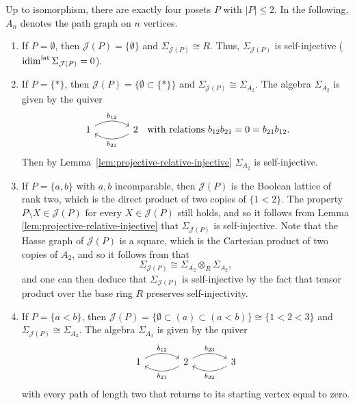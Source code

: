 \documentclass[a4paper,leqno]{amsart}
\begin{document}
\begin{eg}\label{eg:posets-at-most-two-elements}
Up to isomorphism, there are exactly four posets $P$ with $|P|\leq2$. In the following, $A_n$ denotes the path graph on $n$ vertices.
\begin{enumerate}
\item If $P=\emptyset$, then $\mathcal J(P)=\{\emptyset\}$ and $\Sigma_{\mathcal J(P)}\cong R$.  Thus, $\Sigma_{\mathcal{J}(P)}$ is self-injective ($\operatorname{idim}^{\operatorname{lat}} \Sigma_{\mathcal{J}(P)}=0$).

\item If $P=\{\ast\}$, then $\mathcal J(P)=\{\emptyset \subset \{\ast\}\}$ and $\Sigma_{\mathcal J(P)}\cong\Sigma_{A_2}$. The algebra $\Sigma_{A_2}$ is given by the quiver
\[
\begin{tikzcd}[column sep=large]
{1} & {2}
\arrow["{b_{12}}", from=1-1, to=1-2, bend left]
\arrow["{b_{21}}", from=1-2, to=1-1, bend left]
\end{tikzcd} \;\; \text{with relations } b_{12}b_{21}=0=b_{21}b_{12}.
\]
Then by Lemma~\ref{lem:projective-relative-injective} $\Sigma_{A_2}$ is self-injective.

\item If $P=\{a,b\}$ with $a,b$ incomparable, then $\mathcal J(P)$ is the Boolean lattice of rank two, which is the direct product of two copies of $\{1<2\}$.  The property $P\setminus X\in\mathcal J(P)$ for every $X\in\mathcal J(P)$ still holds, and so it follows from Lemma \ref{lem:projective-relative-injective} that $\Sigma_{\mathcal{J}(P)}$ is self-injective.
Note that the Hasse graph of $\mathcal{J}(P)$ is a square, which is the Cartesian product of two copies of $A_2$, and so it follows from \cite[Proposition~3.2]{CX26} that
\[
\Sigma_{\mathcal J(P)}\cong\Sigma_{A_2}\otimes_R\Sigma_{A_2},
\]
and one can then deduce that $\Sigma_{\mathcal{J}(P)}$ is self-injective by the fact that tensor product over the base ring $R$ preserves self-injectivity.

\item If $P=\{a<b\}$, then $\mathcal J(P)=\{\emptyset \subset (a)\subset (a<b)\}\cong \{1<2<3\}$ and $\Sigma_{\mathcal J(P)}\cong\Sigma_{A_3}$. The algebra $\Sigma_{A_3}$ is given by the quiver
\[
\begin{tikzcd}[column sep=large]
{1} & {2} & {3}
\arrow["{b_{12}}", from=1-1, to=1-2, bend left]
\arrow["{b_{21}}", from=1-2, to=1-1, bend left]
\arrow["{b_{23}}", from=1-2, to=1-3, bend left]
\arrow["{b_{32}}", from=1-3, to=1-2, bend left]
\end{tikzcd}
\]
with every path of length two that returns to its starting vertex equal to zero.


\end{enumerate}
\end{eg}
\end{document}
